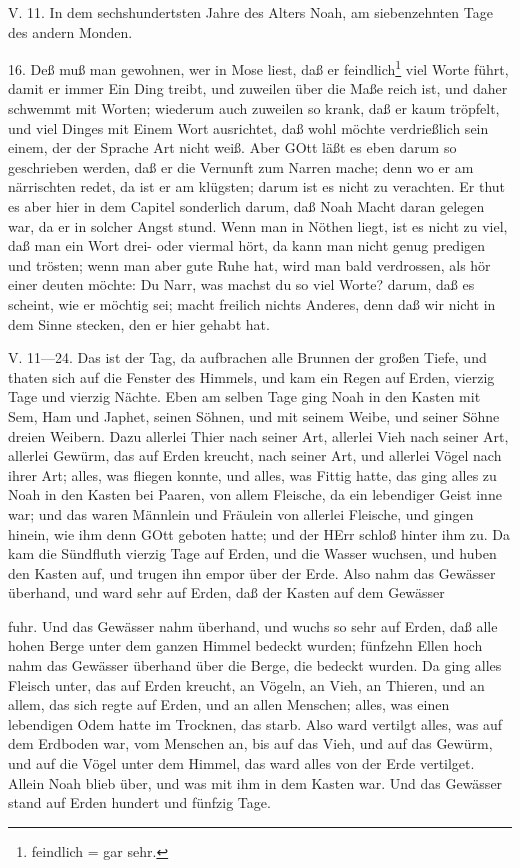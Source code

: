 \begin{schriftzitat}
V. 11. In dem sechshundertsten Jahre des Alters Noah, am siebenzehnten Tage des andern Monden.
\end{schriftzitat}

16. Deß muß man gewohnen, wer in Mose liest, daß er feindlich\footnote{feindlich = gar sehr.} viel Worte führt, damit er immer Ein Ding treibt, und zuweilen über die Maße reich ist, und daher schwemmt mit Worten; wiederum auch zuweilen so krank, daß er kaum tröpfelt, und viel Dinges mit Einem Wort ausrichtet, daß wohl möchte verdrießlich sein einem, der der Sprache Art nicht weiß. Aber GOtt läßt es eben darum so geschrieben werden, daß er die Vernunft zum Narren mache; denn wo er am närrischten redet, da ist er am klügsten; darum ist es nicht zu verachten. Er thut es aber hier in dem Capitel sonderlich darum, daß Noah Macht daran gelegen war, da er in solcher Angst stund. Wenn man in Nöthen liegt, ist es nicht zu viel, daß man ein Wort drei- oder viermal hört, da kann man nicht genug predigen und trösten; wenn man aber gute Ruhe hat, wird man bald verdrossen, als hör einer deuten möchte: Du Narr, was machst du so viel Worte? darum, daß es scheint, wie er möchtig sei; macht freilich nichts Anderes, denn daß wir nicht in dem Sinne stecken, den er hier gehabt hat.

\begin{schriftzitat}
V. 11—24. Das ist der Tag, da aufbrachen alle Brunnen der großen Tiefe, und thaten sich auf die Fenster des Himmels, und kam ein Regen auf Erden, vierzig Tage und vierzig Nächte. Eben am selben Tage ging Noah in den Kasten mit Sem, Ham und Japhet, seinen Söhnen, und mit seinem Weibe, und seiner Söhne dreien Weibern. Dazu allerlei Thier nach seiner Art, allerlei Vieh nach seiner Art, allerlei Gewürm, das auf Erden kreucht, nach seiner Art, und allerlei Vögel nach ihrer Art; alles, was fliegen konnte, und alles, was Fittig hatte, das ging alles zu Noah in den Kasten bei Paaren, von allem Fleische, da ein lebendiger Geist inne war; und das waren Männlein und Fräulein von allerlei Fleische, und gingen hinein, wie ihm denn GOtt geboten hatte; und der HErr schloß hinter ihm zu. Da kam die Sündfluth vierzig Tage auf Erden, und die Wasser wuchsen, und huben den Kasten auf, und trugen ihn empor über der Erde. Also nahm das Gewässer überhand, und ward sehr auf Erden, daß der Kasten auf dem Gewässer

fuhr. Und das Gewässer nahm überhand, und wuchs so sehr auf Erden, daß alle hohen Berge unter dem ganzen Himmel bedeckt wurden; fünfzehn Ellen hoch nahm das Gewässer überhand über die Berge, die bedeckt wurden. Da ging alles Fleisch unter, das auf Erden kreucht, an Vögeln, an Vieh, an Thieren, und an allem, das sich regte auf Erden, und an allen Menschen; alles, was einen lebendigen Odem hatte im Trocknen, das starb. Also ward vertilgt alles, was auf dem Erdboden war, vom Menschen an, bis auf das Vieh, und auf das Gewürm, und auf die Vögel unter dem Himmel, das ward alles von der Erde vertilget. Allein Noah blieb über, und was mit ihm in dem Kasten war. Und das Gewässer stand auf Erden hundert und fünfzig Tage.
\end{schriftzitat}

